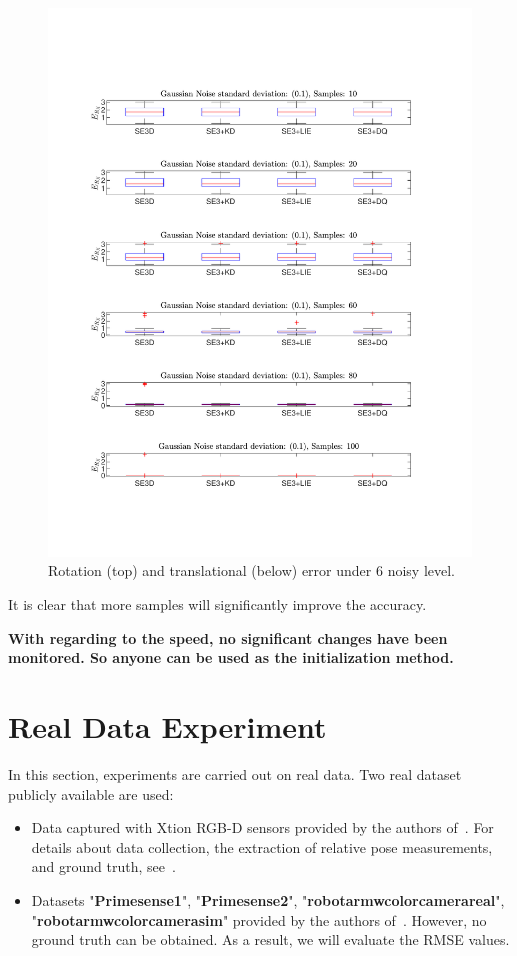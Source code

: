 \begin{figure}
\includegraphics[scale=0.4]{./hand_eye_figures/se3/t_vs_num}
\caption{Rotation (top) and translational (below) error under $6$ noisy level.}
\end{figure}
It is clear that more samples will significantly improve the accuracy.

\textbf{With regarding to the speed, no significant changes have been monitored. So anyone can be used as the initialization method.}


\section{Real Data Experiment}
In this section, experiments are carried out on real data. Two real dataset publicly available are used:
\begin{itemize}
\item Data captured with Xtion RGB-D sensors provided by
the authors of~\cite{brookshire2013extrinsic}. For details about data collection, the extraction of relative
pose measurements, and ground truth, see~\cite{brookshire2013extrinsic}.
\item Datasets "\textbf{Primesense{\textunderscore}1}", "\textbf{Primesense{\textunderscore}2}", "\textbf{robot{\textunderscore}arm{\textunderscore}w{\textunderscore}color{\textunderscore}camera{\textunderscore}real}", "\textbf{robot{\textunderscore}arm{\textunderscore}w{\textunderscore}color{\textunderscore}camera{\textunderscore}sim}" provided by
the authors of~\cite{furrer2018evaluation}. However, no ground truth can be obtained. As a result, we will evaluate the RMSE values.
\end{itemize}


